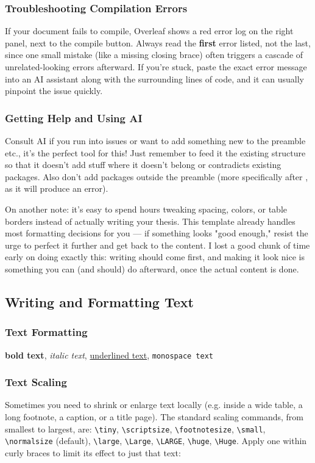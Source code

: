 \subsubsection*{Troubleshooting Compilation Errors}
If your document fails to compile, Overleaf shows a red error log on the right panel, next to the compile button. Always read the \textbf{first} error listed, not the last, since one small mistake (like a missing closing brace) often triggers a cascade of unrelated-looking errors afterward. If you're stuck, paste the exact error message into an AI assistant along with the surrounding lines of code, and it can usually pinpoint the issue quickly.

\subsubsection*{Getting Help and Using AI}
Consult AI if you run into issues or want to add something new to the preamble etc., it's the perfect tool for this! Just remember to feed it the existing structure so that it doesn't add stuff where it doesn't belong or contradicts existing packages. Also don't add packages outside the preamble (more specifically after \verb||, as it will produce an error).

On another note: it's easy to spend hours tweaking spacing, colors, or table borders instead of actually writing your thesis. This template already handles most formatting decisions for you --- if something looks "good enough," resist the urge to perfect it further and get back to the content. I lost a good chunk of time early on doing exactly this: writing should come first, and making it look nice is something you can (and should) do afterward, once the actual content is done.


\subsection*{Writing and Formatting Text}

\subsubsection*{Text Formatting}
\textbf{bold text}, \textit{italic text}, \underline{underlined text}, \texttt{monospace text}

\subsubsection*{Text Scaling}
Sometimes you need to shrink or enlarge text locally (e.g. inside a wide table, a long footnote, a caption, or a title page). The standard scaling commands, from smallest to largest, are: \verb|\tiny|, \verb|\scriptsize|, \verb|\footnotesize|, \verb|\small|, \verb|\normalsize| (default), \verb|\large|, \verb|\Large|, \verb|\LARGE|, \verb|\huge|, \verb|\Huge|. Apply one within curly braces to limit its effect to just that text:

